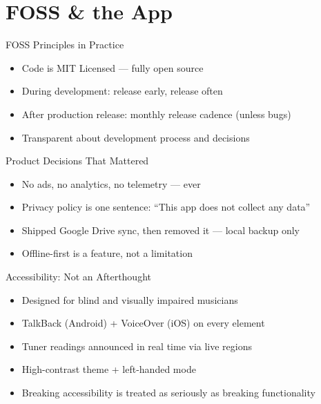 \documentclass[aspectratio=169]{beamer}
\begin{document}
\section{FOSS \& the App}

\begin{frame}{FOSS Principles in Practice}
  \begin{itemize}
    \item Code is MIT Licensed --- fully open source
    \item During development: release early, release often
    \item After production release: monthly release cadence (unless bugs)
    \item Transparent about development process and decisions
  \end{itemize}
\end{frame}

\begin{frame}{Product Decisions That Mattered}
  \begin{itemize}
    \item No ads, no analytics, no telemetry --- ever
    \item Privacy policy is one sentence: ``This app does not collect any data''
    \item Shipped Google Drive sync, then removed it --- local backup only
    \item Offline-first is a feature, not a limitation
  \end{itemize}
\end{frame}

\begin{frame}{Accessibility: Not an Afterthought}
  \begin{itemize}
    \item Designed for blind and visually impaired musicians
    \item TalkBack (Android) + VoiceOver (iOS) on every element
    \item Tuner readings announced in real time via live regions
    \item High-contrast theme + left-handed mode
    \item Breaking accessibility is treated as seriously as breaking functionality
  \end{itemize}
\end{frame}
\end{document}
